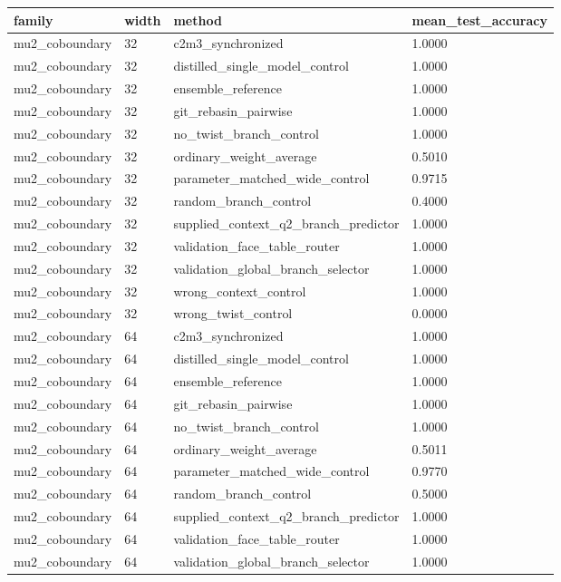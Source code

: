 \begin{tabular}{llll}
\toprule
family & width & method & mean_test_accuracy\\
\midrule
mu2\_coboundary & 32 & c2m3\_synchronized & 1.0000\\
mu2\_coboundary & 32 & distilled\_single\_model\_control & 1.0000\\
mu2\_coboundary & 32 & ensemble\_reference & 1.0000\\
mu2\_coboundary & 32 & git\_rebasin\_pairwise & 1.0000\\
mu2\_coboundary & 32 & no\_twist\_branch\_control & 1.0000\\
mu2\_coboundary & 32 & ordinary\_weight\_average & 0.5010\\
mu2\_coboundary & 32 & parameter\_matched\_wide\_control & 0.9715\\
mu2\_coboundary & 32 & random\_branch\_control & 0.4000\\
mu2\_coboundary & 32 & supplied\_context\_q2\_branch\_predictor & 1.0000\\
mu2\_coboundary & 32 & validation\_face\_table\_router & 1.0000\\
mu2\_coboundary & 32 & validation\_global\_branch\_selector & 1.0000\\
mu2\_coboundary & 32 & wrong\_context\_control & 1.0000\\
mu2\_coboundary & 32 & wrong\_twist\_control & 0.0000\\
mu2\_coboundary & 64 & c2m3\_synchronized & 1.0000\\
mu2\_coboundary & 64 & distilled\_single\_model\_control & 1.0000\\
mu2\_coboundary & 64 & ensemble\_reference & 1.0000\\
mu2\_coboundary & 64 & git\_rebasin\_pairwise & 1.0000\\
mu2\_coboundary & 64 & no\_twist\_branch\_control & 1.0000\\
mu2\_coboundary & 64 & ordinary\_weight\_average & 0.5011\\
mu2\_coboundary & 64 & parameter\_matched\_wide\_control & 0.9770\\
mu2\_coboundary & 64 & random\_branch\_control & 0.5000\\
mu2\_coboundary & 64 & supplied\_context\_q2\_branch\_predictor & 1.0000\\
mu2\_coboundary & 64 & validation\_face\_table\_router & 1.0000\\
mu2\_coboundary & 64 & validation\_global\_branch\_selector & 1.0000\\

\end{tabular}
